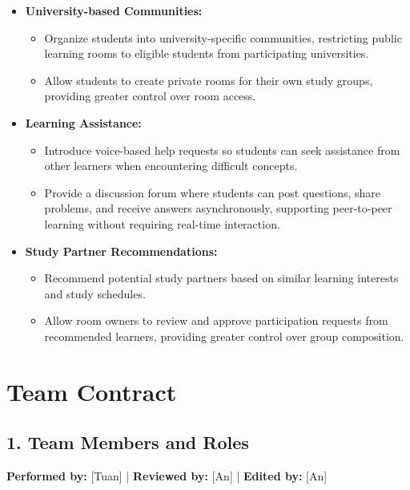 \documentclass[12pt]{article}
\begin{document}
\begin{itemize}
    \item \textbf{University-based Communities:}
    \begin{itemize}
        \item Organize students into university-specific communities, restricting public learning rooms to eligible students from participating universities.
        \item Allow students to create private rooms for their own study groups, providing greater control over room access.
    \end{itemize}
    \item \textbf{Learning Assistance:}
    \begin{itemize}
        \item Introduce voice-based help requests so students can seek assistance from other learners when encountering difficult concepts.
        \item Provide a discussion forum where students can post questions, share problems, and receive answers asynchronously, supporting peer-to-peer learning without requiring real-time interaction.
    \end{itemize}
    \item \textbf{Study Partner Recommendations:}
    \begin{itemize}
        \item Recommend potential study partners based on similar learning interests and study schedules.
        \item Allow room owners to review and approve participation requests from recommended learners, providing greater control over group composition.
    \end{itemize}
\end{itemize}

\pagebreak
\section{Team Contract}

\subsection{1. Team Members and Roles}

\textbf{Performed by:} [Tuan] | \textbf{Reviewed by:} [An] | \textbf{Edited by:} [An]
\end{document}
